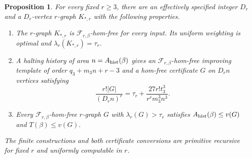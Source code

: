 \documentclass[10pt]{article}
\numberwithin{equation}{section}
\newtheorem{proposition}[proposition]{Proposition}\aliascntresetthe{proposition}
\theoremstyle{definition}
\begin{document}
\begin{proposition}\label{prop:v3-certificates}
For every fixed $r\ge3$, there are an effectively specified integer $D_r$ and a $D_r$-vertex $r$-graph $K_{*,r}$ with the following properties.
\begin{enumerate}
\item The $r$-graph $K_{*,r}$ is $\mathcal F_{r,\beta}$-hom-free for every input. Its uniform weighting is optimal and $\lambda_r(K_{*,r})=\tau_r$.
\item A halting history of area $n=A_{\rm hist}(\beta)$ gives an $\mathcal F_{r,\beta}$-hom-free improving template of order $q_3+m_3n+r-3$ and a hom-free certificate $G$ on $D_rn$ vertices satisfying
\begin{equation}\label{eq:v3-certificate-gap}
 \frac{r!|G|}{(D_rn)^r}
 =\tau_r+\frac{27r!t_3^3}{r^rm_3^3n^3}.
\end{equation}
\item Every $\mathcal F_{r,\beta}$-hom-free $r$-graph $G$ with $\lambda_r(G)>\tau_r$ satisfies $A_{\rm hist}(\beta)\le v(G)$ and $T(\beta)\le v(G)$.
\end{enumerate}
The finite constructions and both certificate conversions are primitive recursive for fixed $r$ and uniformly computable in $r$.
\end{proposition}
\end{document}
